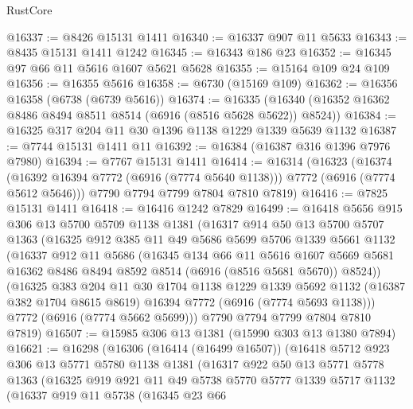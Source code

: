 \begin{lexlean}{RustCore}
\begin{coremodule}
@16337 := @8426 @15131 @1411
@16340 := @16337 @907 @11 @5633
@16343 := @8435 @15131 @1411 @1242
@16345 := @16343 @186 @23
@16352 := @16345 @97 @66 @11 @5616 @1607 @5621 @5628
@16355 := @15164 @109 @24 @109
@16356 := @16355 @5616
@16358 := @6730 (@15169 @109)
@16362 := @16356 @16358 (@6738 (@6739 @5616))
@16374 := @16335 (@16340 (@16352 @16362 @8486 @8494 @8511 @8514 (@6916 (@8516 @5628 @5622)) @8524))
@16384 := @16325 @317 @204 @11 @30 @1396 @1138 @1229 @1339 @5639 @1132
@16387 := @7744 @15131 @1411 @11
@16392 := @16384 (@16387 @316 @1396 @7976 @7980)
@16394 := @7767 @15131 @1411
@16414 := @16314
    (@16323
      (@16374 (@16392 @16394 @7772 (@6916 (@7774 @5640 @1138))) @7772 (@6916 (@7774 @5612 @5646)))
      @7790
      @7794
      @7799
      @7804
      @7810
      @7819)
@16416 := @7825 @15131 @1411
@16418 := @16416 @1242 @7829
@16499 := @16418
    @5656
    @915
    @306
    @13
    @5700
    @5709
    @1138
    @1381
    (@16317
      @914
      @50
      @13
      @5700
      @5707
      @1363
      (@16325
        @912
        @385
        @11
        @49
        @5686
        @5699
        @5706
        @1339
        @5661
        @1132
        (@16337
          @912
          @11
          @5686
          (@16345
            @134
            @66
            @11
            @5616
            @1607
            @5669
            @5681
            @16362
            @8486
            @8494
            @8592
            @8514
            (@6916 (@8516 @5681 @5670))
            @8524))
        (@16325
          @383
          @204
          @11
          @30
          @1704
          @1138
          @1229
          @1339
          @5692
          @1132
          (@16387 @382 @1704 @8615 @8619)
          @16394
          @7772
          (@6916 (@7774 @5693 @1138)))
        @7772
        (@6916 (@7774 @5662 @5699)))
      @7790
      @7794
      @7799
      @7804
      @7810
      @7819)
@16507 := @15985 @306 @13 @1381 (@15990 @303 @13 @1380 @7894)
@16621 := @16298
    (@16306
      (@16414 (@16499 @16507))
      (@16418
        @5712
        @923
        @306
        @13
        @5771
        @5780
        @1138
        @1381
        (@16317
          @922
          @50
          @13
          @5771
          @5778
          @1363
          (@16325
            @919
            @921
            @11
            @49
            @5738
            @5770
            @5777
            @1339
            @5717
            @1132
            (@16337
              @919
              @11
              @5738
              (@16345
                @23
                @66

\end{coremodule}
\end{lexlean}
